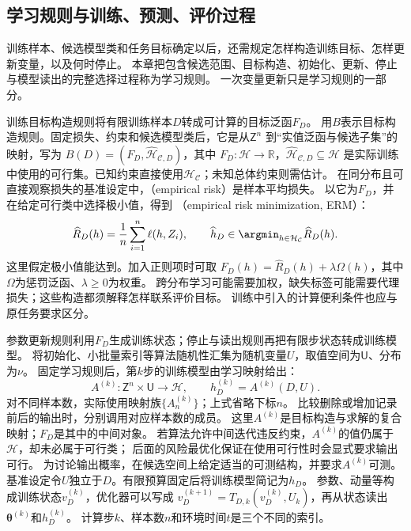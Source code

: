 \subsection{学习规则与训练、预测、评价过程}
\label{sec:future-learning-common-objects}
\label{sec:future-sampling-and-empirical-objective}
\label{sec:future-population-empirical-computation}

训练样本、候选模型类和任务目标确定以后，还需规定怎样构造训练目标、怎样更新变量，以及何时停止。
本章把包含候选范围、目标构造、初始化、更新、停止与模型读出的完整选择过程称为学习规则。
一次变量更新只是学习规则的一部分。

训练目标构造规则将有限训练样本$D$转成可计算的目标泛函$F_D$。
用$B$表示目标构造规则。固定损失、约束和候选模型类后，它是从$\mathsf Z^n$
到“实值泛函与候选子集”的映射，写为
$B(D)=(F_D,\widehat{\mathcal H}_{\mathcal C,D})$，其中
$F_D:\mathcal H\to\mathbb R$，$\widehat{\mathcal H}_{\mathcal C,D}\subseteq\mathcal H$
是实际训练中使用的可行集。已知约束直接使用$\mathcal H_{\mathcal C}$；未知总体约束则需估计。
在同分布且可直接观察损失的基准设定中，（empirical risk）是样本平均损失。
以它为$F_D$，并在给定可行类中选择极小值，得到
（empirical risk minimization, ERM）：
\begin{equation}
  \widehat R_D(h)=\frac1n\sum_{i=1}^n\ell(h,Z_i),\qquad
  \widehat h_D\in\argmin_{h\in\mathcal H_{\mathcal C}}\widehat R_D(h).
  \label{eq:future-unified-empirical-problem}
\end{equation}
这里假定极小值能达到。加入正则项时可取
$F_D(h)=\widehat R_D(h)+\lambda\Omega(h)$，其中$\Omega$为惩罚泛函、$\lambda\geq0$为权重。
跨分布学习可能需要加权，缺失标签可能需要代理损失；这些构造都须解释怎样联系评价目标。
训练中引入的计算便利条件也应与原任务要求区分。

参数更新规则利用$F_D$生成训练状态；停止与读出规则再把有限步状态转成训练模型。
将初始化、小批量索引等算法随机性汇集为随机变量$U$，取值空间为$\mathsf U$、分布为$\nu$。
固定学习规则后，第$k$步的训练模型由学习映射给出：
\begin{equation}
  A^{(k)}:\mathsf Z^n\times\mathsf U\to\mathcal H,
  \qquad h_D^{(k)}=A^{(k)}(D,U).
  \label{eq:future-learning-algorithm-output}
\end{equation}
对不同样本数，实际使用映射族$\{A_n^{(k)}\}$；上式省略下标$n$。
比较删除或增加记录前后的输出时，分别调用对应样本数的成员。
这里$A^{(k)}$是目标构造与求解的复合映射；$F_D$是其中的中间对象。
若算法允许中间迭代违反约束，$A^{(k)}$的值仍属于$\mathcal H$，却未必属于可行类；
后面的风险最优化保证在使用可行性时会显式要求输出可行。
为讨论输出概率，在候选空间上给定适当的可测结构，并要求$A^{(k)}$可测。
基准设定令$U$独立于$D$。有限预算固定后将训练模型简记为$h_D$。
参数、动量等构成训练状态$v_D^{(k)}$，优化器可以写成
$v_D^{(k+1)}=T_{D,k}(v_D^{(k)},U_k)$，再从状态读出$\bm\theta^{(k)}$和$h_D^{(k)}$。
计算步$k$、样本数$n$和环境时间$t$是三个不同的索引。

